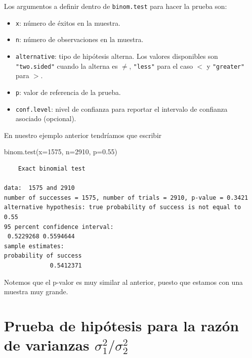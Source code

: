 \documentclass[
]{book}
\newenvironment{Shaded}{\begin{snugshade}}{\end{snugshade}}
\newcommand{\AttributeTok}[1]{\textcolor[rgb]{0.77,0.63,0.00}{#1}}
\newcommand{\DecValTok}[1]{\textcolor[rgb]{0.00,0.00,0.81}{#1}}
\newcommand{\FloatTok}[1]{\textcolor[rgb]{0.00,0.00,0.81}{#1}}
\newcommand{\FunctionTok}[1]{\textcolor[rgb]{0.00,0.00,0.00}{#1}}
\newcommand{\NormalTok}[1]{#1}
\providecommand{\tightlist}{%
  \setlength{\itemsep}{0pt}\setlength{\parskip}{0pt}}
\begin{document}
Los argumentos a definir dentro de \texttt{binom.test} para hacer la prueba son:

\begin{itemize}
\tightlist
\item
  \texttt{x}: número de éxitos en la muestra.
\item
  \texttt{n}: número de observaciones en la muestra.
\item
  \texttt{alternative}: tipo de hipótesis alterna. Los valores disponibles son \texttt{"two.sided"} cuando la alterna es \(\neq\), \texttt{"less"} para el caso \(<\) y \texttt{"greater"} para \(>\).
\item
  \texttt{p}: valor de referencia de la prueba.
\item
  \texttt{conf.level}: nivel de confianza para reportar el intervalo de confianza asociado (opcional).
\end{itemize}

En nuestro ejemplo anterior tendríamos que escribir

\begin{Shaded}
\begin{Highlighting}[]
\FunctionTok{binom.test}\NormalTok{(}\AttributeTok{x=}\DecValTok{1575}\NormalTok{, }\AttributeTok{n=}\DecValTok{2910}\NormalTok{, }\AttributeTok{p=}\FloatTok{0.55}\NormalTok{)}
\end{Highlighting}
\end{Shaded}

\begin{verbatim}
    Exact binomial test

data:  1575 and 2910
number of successes = 1575, number of trials = 2910, p-value = 0.3421
alternative hypothesis: true probability of success is not equal to 0.55
95 percent confidence interval:
 0.5229268 0.5594644
sample estimates:
probability of success 
             0.5412371 
\end{verbatim}

Notemos que el p-valor es muy similar al anterior, puesto que estamos con una muestra muy grande.

\hypertarget{prueba-de-hipuxf3tesis-para-la-razuxf3n-de-varianzas-sigma_12-sigma_22}{%
\section{\texorpdfstring{Prueba de hipótesis para la razón de varianzas \(\sigma_1^2 / \sigma_2^2\)}{Prueba de hipótesis para la razón de varianzas \textbackslash sigma\_1\^{}2 / \textbackslash sigma\_2\^{}2}}\label{prueba-de-hipuxf3tesis-para-la-razuxf3n-de-varianzas-sigma_12-sigma_22}}
\end{document}
